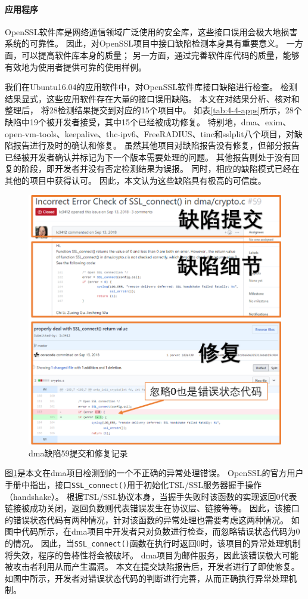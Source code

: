 \paragraph{应用程序}



OpenSSL软件库是网络通信领域广泛使用的安全库，这些接口误用会极大地损害系统的可靠性。
因此，对OpenSSL项目中接口缺陷检测本身具有重要意义。
一方面，可以提高软件库本身的质量；
另一方面，通过完善软件库代码的质量，能够有效地为使用者提供可靠的使用样例。

我们在Ubuntu16.04的应用软件中，对OpenSSL软件库接口缺陷进行检查。
检测结果显式，这些应用软件存在大量的接口误用缺陷。
本文在对结果分析、核对和整理后，
将28检测结果提交到对应的15个项目中。
如表\ref{tab:4-4-apps}所示，28个缺陷中19个被开发者接受，其中15个已经被成功修复。
特别地，dma、exim、open-vm-tools、keepalive、thc-ipv6、FreeRADIUS、tinc和sslplit八个项目，对缺陷报告进行及时的确认和修复。
虽然其他项目对缺陷报告没有修复，但部分报告已经被开发者确认并标记为下一个版本需要处理的问题。
其他报告则处于没有回复的阶段，即开发者并没有否定检测结果为误报。
同时，相应的缺陷模式已经在其他的项目中获得认可。
因此，本文认为这些缺陷具有极高的可信度。

\begin{figure}[t]
	\centering
	\includegraphics[width=0.8\linewidth]{figures/cp4-dma-example.png}
	\caption{
		dma缺陷59提交和修复记录
	}
	\label{fig:4-4-dma-example}
\end{figure}

图\ref{fig:4-4-dma-example}是本文在dma项目检测到的一个不正确的异常处理错误。
OpenSSL的官方用户手册中指出，接口\texttt{SSL\_connect()}用于初始化TSL/SSL服务器握手操作（handshake）。
根据TSL/SSL协议本身，当握手失败时该函数的实现返回0代表链接被成功关闭，返回负数则代表错误发生在协议层、链接等等。
因此，该接口的错误状态代码有两种情况，针对该函数的异常处理也需要考虑这两种情况。
如图中代码所示，在dma项目中开发者只对负数进行检查，而忽略错误状态代码为0的情况。
因此，当\texttt{SSL\_connect()}函数在执行时返回0时，该项目的异常处理机制将失效，程序的鲁棒性将会被破坏。
dma项目为邮件服务，因此该错误极大可能被攻击者利用从而产生漏洞。
本文在提交缺陷报告后，开发者进行了即使修复。
如图中所示，开发者对错误状态代码的判断进行完善，从而正确执行异常处理机制。



